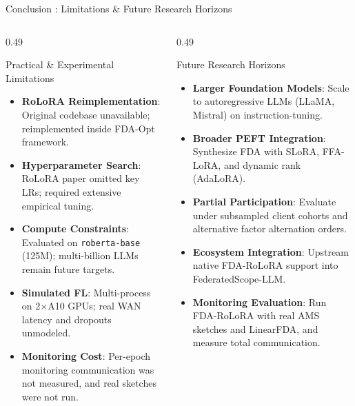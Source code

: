 \documentclass[aspectratio=169]{beamer}
\begin{document}
\begin{frame}{Conclusion : Limitations \& Future Research Horizons}
    \begin{columns}
        \begin{column}{0.49\textwidth}
            \begin{block}{Practical \& Experimental Limitations}
                \scriptsize
                \begin{itemize}
                    \item \textbf{RoLoRA Reimplementation}: Original codebase unavailable; reimplemented inside FDA-Opt framework.
                    \item \textbf{Hyperparameter Search}: RoLoRA paper omitted key LRs; required extensive empirical tuning.
                    \item \textbf{Compute Constraints}: Evaluated on \texttt{roberta-base} (125M); multi-billion LLMs remain future targets.
                    \item \textbf{Simulated FL}: Multi-process on 2$\times$A10 GPUs; real WAN latency and dropouts unmodeled.
                    \item \textbf{Monitoring Cost}: Per-epoch monitoring communication was not measured, and real sketches were not run.
                \end{itemize}
            \end{block}
        \end{column}
        \begin{column}{0.49\textwidth}
            \begin{block}{Future Research Horizons}
                \scriptsize
                \begin{itemize}
                    \item \textbf{Larger Foundation Models}: Scale to autoregressive LLMs (LLaMA, Mistral) on instruction-tuning.
                    \item \textbf{Broader PEFT Integration}: Synthesize FDA with SLoRA, FFA-LoRA, and dynamic rank (AdaLoRA).
                    \item \textbf{Partial Participation}: Evaluate under subsampled client cohorts and alternative factor alternation orders.
                    \item \textbf{Ecosystem Integration}: Upstream native FDA-RoLoRA support into FederatedScope-LLM.
                    \item \textbf{Monitoring Evaluation}: Run FDA-RoLoRA with real AMS sketches and LinearFDA, and measure total communication.
                \end{itemize}
            \end{block}
        \end{column}
    \end{columns}
\end{frame}
\end{document}
